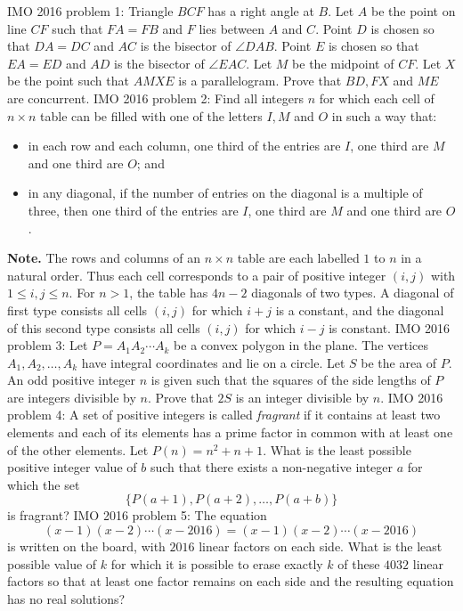 IMO 2016 problem 1:  Triangle $BCF$ has a right angle at $B$. Let $A$ be the point on line $CF$ such that $FA=FB$ and $F$ lies between $A$ and $C$. Point $D$ is chosen so that $DA=DC$ and $AC$ is the bisector of $\angle{DAB}$. Point $E$ is chosen so that $EA=ED$ and $AD$ is the bisector of $\angle{EAC}$. Let $M$ be the midpoint of $CF$. Let $X$ be the point such that $AMXE$ is a parallelogram. Prove that $BD,FX$ and $ME$ are concurrent. 
IMO 2016 problem 2:  Find all integers $n$ for which each cell of $n \times n$ table can be filled with one of the letters $I,M$ and $O$ in such a way that:
\begin{itemize}
  \item in each row and each column, one third of the entries are $I$, one third are $M$ and one third are $O$; and 
  \item in any diagonal, if the number of entries on the diagonal is a multiple of three, then one third of the entries are $I$, one third are $M$ and one third are $O$.
\end{itemize}
\textbf{Note.} The rows and columns of an $n \times n$ table are each labelled $1$ to $n$ in a natural order. Thus each cell corresponds to a pair of positive integer $(i,j)$ with $1 \le i,j \le n$. For $n>1$, the table has $4n-2$ diagonals of two types. A diagonal of first type consists all cells $(i,j)$  for which $i+j$ is a constant, and the diagonal of this second type consists all cells $(i,j)$ for which $i-j$ is constant. 
IMO 2016 problem 3:  Let $P=A_1A_2\cdots A_k$ be a convex polygon in the plane. The vertices $A_1, A_2, \ldots, A_k$ have integral coordinates and lie on a circle. Let $S$ be the area of $P$. An odd positive integer $n$ is given such that the squares of the side lengths of $P$ are integers divisible by $n$. Prove that $2S$ is an integer divisible by $n$. 
IMO 2016 problem 4:  A set of positive integers is called \textit{fragrant} if it contains at least two elements and each of its elements has a prime factor in common with at least one of the other elements.  Let $P(n)=n^2+n+1$.  What is the least possible positive integer value of $b$ such that there exists a non-negative integer $a$ for which the set
\[ \{P(a+1),P(a+2),\ldots,P(a+b)\} \]
is fragrant? 
IMO 2016 problem 5:  The equation
\[ (x-1)(x-2)\cdots(x-2016)=(x-1)(x-2)\cdots (x-2016) \]
is written on the board, with $2016$ linear factors on each side. What is the least possible value of $k$ for which it is possible to erase exactly $k$ of these $4032$ linear factors so that at least one factor remains on each side and the resulting equation has no real solutions? 
